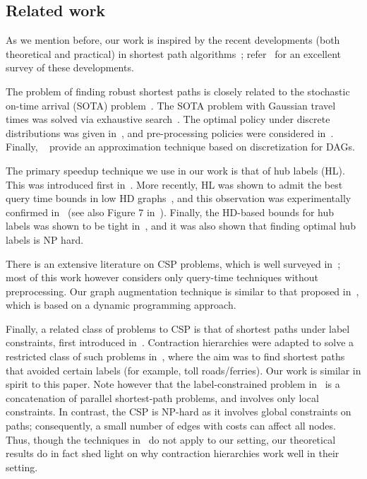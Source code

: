 \subsection{Related work}

As we mention before, our work is inspired by the recent developments (both theoretical and practical) in shortest path algorithms~\cite{highway2013,hubimplem,highway2010,dimacs09,geisberger_ch_definition,skeleton}; refer~\cite{goldberg_survey} for an excellent survey of these developments. 


The problem of finding robust shortest paths is closely related to the stochastic on-time arrival (SOTA) problem~\cite{fan2005arriving}.
The SOTA problem with Gaussian travel times was solved via exhaustive search~\cite{nikolova_gaussian}. The optimal policy under discrete distributions was given in~\cite{samaranayake2012speedup}, and pre-processing policies were considered in~\cite{sabran2014precomputation}. Finally, ~\cite{nikolova_discretization} provide an approximation technique based on discretization for DAGs.

The primary speedup technique we use in our work is that of hub labels (HL). This was introduced first in~\cite{cohen_definition_hl}. More recently, HL was shown to admit the best query time bounds in low HD graphs~\cite{highway2010,highway2013}, and this observation was experimentally confirmed in~\cite{hubimplem} (see also Figure 7 in~\cite{goldberg_survey}).  
Finally, the HD-based bounds for hub labels was shown to be tight in~\cite{babenko_hl_complexity,white_complexity_hd}, and it was also shown that finding optimal hub labels is NP hard.

There is an extensive literature on CSP problems, which is well surveyed in~\cite{csp_survey}; most of this work however considers only query-time techniques without preprocessing. Our graph augmentation technique is similar to that proposed in~\cite{alex_bicriteria}, which is based on a dynamic programming approach. 

Finally, a related class of problems to CSP is that of shortest paths under label constraints, first introduced in~\cite{language_csp}. Contraction hierarchies were adapted to solve a restricted class of such problems in~\cite{rice_csp}, where the aim was to find shortest paths that avoided certain labels (for example, toll roads/ferries). Our work is similar in spirit to this paper. Note however that the label-constrained problem in~\cite{rice_csp} is a concatenation of parallel shortest-path problems, and involves only local constraints. 
In contrast, the CSP is NP-hard as it involves global constraints on paths; consequently, a small number of edges with costs can affect all nodes. Thus, though the techniques in~\cite{rice_csp} do not apply to our setting, our theoretical results do in fact shed light on why contraction hierarchies work well in their setting.



